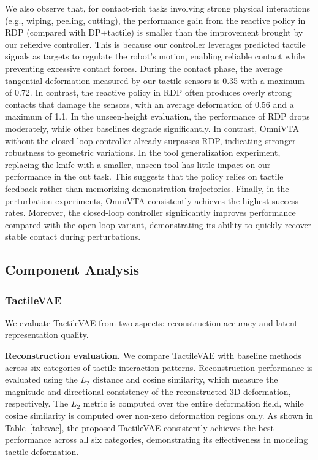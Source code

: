 

We also observe that, for contact-rich tasks involving strong physical interactions (e.g., wiping, peeling, cutting), the performance gain from the reactive policy in RDP (compared with DP+tactile) is smaller than the improvement brought by our reflexive controller.
This is because our controller leverages predicted tactile signals as targets to regulate the robot's motion, enabling reliable contact while preventing excessive contact forces. 
During the contact phase, the average tangential deformation measured by our tactile sensors is 0.35 with a maximum of 0.72. 
In contrast, the reactive policy in RDP often produces overly strong contacts that damage the sensors, with an average deformation of 0.56 and a maximum of 1.1. In the unseen-height evaluation, the performance of RDP drops moderately, while other baselines degrade significantly. 
In contrast, OmniVTA without the closed-loop controller already surpasses RDP, indicating stronger robustness to geometric variations. In the tool generalization experiment, replacing the knife with a smaller, unseen tool has little impact on our performance in the cut task. 
This suggests that the policy relies on tactile feedback rather than memorizing demonstration trajectories. Finally, in the perturbation experiments, OmniVTA consistently achieves the highest success rates. 
Moreover, the closed-loop controller significantly improves performance compared with the open-loop variant, demonstrating its ability to quickly recover stable contact during perturbations.

\vspace{-3mm}
\subsection{Component Analysis}
\subsubsection{TactileVAE}
We evaluate TactileVAE from two aspects: reconstruction accuracy and latent representation quality.

\noindent \textbf{Reconstruction evaluation.}
We compare TactileVAE with baseline methods across six categories of tactile interaction patterns. 
Reconstruction performance is evaluated using the $L_2$ distance and cosine similarity, which measure the magnitude and directional consistency of the reconstructed 3D deformation, respectively. 
The $L_2$ metric is computed over the entire deformation field, while cosine similarity is computed over non-zero deformation regions only. 
As shown in Table~\ref{tab:vae}, the proposed TactileVAE consistently achieves the best performance across all six categories, demonstrating its effectiveness in modeling tactile deformation.

